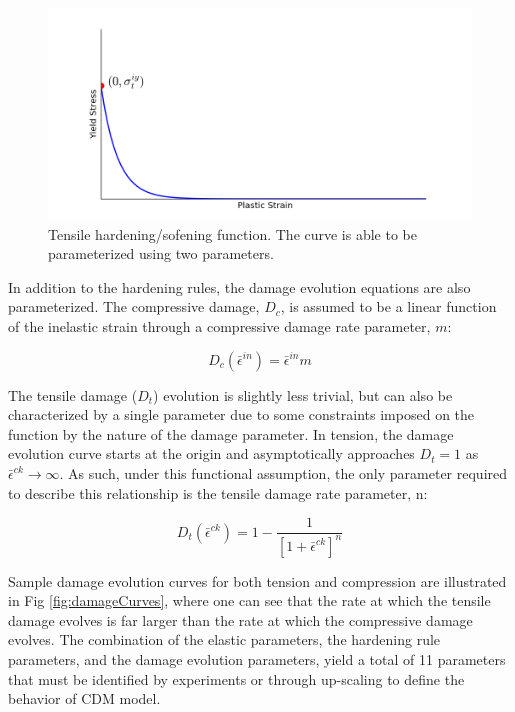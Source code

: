 \begin{figure}[!htb]
\begin{center}
\includegraphics[width=\textwidth]{figures/Chapter3/TensionHardening}
\caption{{\label{fig:tensionHardening} Tensile hardening/sofening function. The curve is able to be parameterized using two parameters.%
}}
\end{center}
\end{figure}

In addition to the hardening rules, the damage evolution equations are also parameterized. The compressive damage, $D_c$, is assumed to be a linear function of the inelastic strain through a compressive damage rate parameter, $m$:

\begin{equation}
D_{c}\left(\bar{\epsilon}^{in}\right)=\bar{\epsilon}^{in}m\label{eqn:param3}
\end{equation}

The tensile damage ($D_{t}$) evolution is slightly less trivial, but can also be characterized by a single parameter due to some constraints imposed on the function by the nature of the damage parameter. In
tension, the damage evolution curve starts at the origin and asymptotically approaches $D_{t}=1$ as $\bar{\epsilon}^{ck}\rightarrow\infty$. As such, under this functional assumption, the only parameter required to describe this relationship is the tensile damage rate parameter, n:

\begin{equation}
D_{t}\left(\bar{\epsilon}^{ck}\right)=1-\frac{1}{\left[1+\bar{\epsilon}^{ck}\right]^{n}}\label{eqn:param4}
\end{equation}

Sample damage evolution curves for both tension and compression are illustrated in Fig \ref{fig:damageCurves}, where one can see that the rate at which the tensile damage evolves is far larger than the rate at which the compressive damage evolves. The combination of the elastic parameters, the hardening rule parameters, and the damage evolution parameters, yield a total of 11 parameters that must be identified by experiments or through up-scaling to define the behavior of CDM model.

